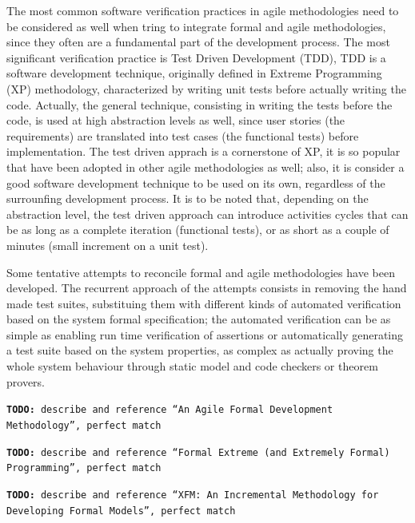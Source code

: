 \documentclass{article} \usepackage{times}
\newcommand{\todo}[1]{\texttt{\textbf{TODO:} #1}}
\begin{document}
The most common software verification practices in agile methodologies need to be considered as well when tring to integrate formal and agile methodologies, since they often are a fundamental part of the development process. 
The most significant verification practice is Test Driven Development (TDD), TDD is a software development technique, originally defined in Extreme Programming (XP) methodology, characterized by writing unit tests before actually writing the code.
Actually, the general technique, consisting in writing the tests before the code, is used at high abstraction levels as well, since user stories (the requirements) are translated into test cases (the functional tests) before implementation.
The test driven apprach is a cornerstone of XP, it is so popular that have been adopted in other agile methodologies as well; also, it is consider a good software development technique to be used on its own, regardless of the surrounfing development process.
It is to be noted that, depending on the abstraction level, the test driven approach can introduce activities cycles that can be as long as a complete iteration (functional tests), or as short as a couple of minutes (small increment on a unit test).

Some tentative attempts to reconcile formal and agile methodologies have been developed.
The recurrent approach of the attempts consists in removing the hand made test suites, substituing them with different kinds of automated verification based on the system formal specification; the automated verification can be as simple as enabling run time verification of assertions or automatically generating a test suite based on the system properties, as complex as actually proving the whole system behaviour through static model and code checkers or theorem provers.

\todo{describe and reference ``An Agile Formal Development Methodology'', perfect match}

\todo{describe and reference ``Formal Extreme (and Extremely Formal) Programming'', perfect match}

\todo{describe and reference ``XFM: An Incremental Methodology for Developing Formal Models'', perfect match}
\end{document}
